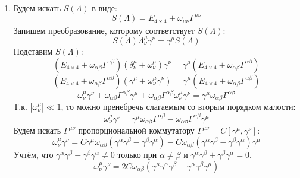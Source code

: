 \documentclass[12pt]{article}
\begin{document}
\begin{enumerate}
    \item Будем искать $S(\Lambda)$ в виде:
    \begin{equation}
        S(\Lambda)=E_{4\times 4}+\omega_{\mu\nu}\Gamma^{\mu\nu}
    \end{equation}
    Запишем преобразование, которому соответствует $S(\Lambda)$:
    \begin{equation}
        S(\Lambda)\Lambda_\nu^\mu\gamma^\nu=\gamma^\mu S(\Lambda)
    \end{equation}
    Подставим $S(\Lambda)$:
    \begin{equation}
        (E_{4\times 4}+\omega_{\alpha\beta}\Gamma^{\alpha\beta})(\delta_\nu^\mu+\omega_\nu^\mu)\gamma^\nu=\gamma^\mu(E_{4\times 4}+\omega_{\alpha\beta}\Gamma^{\alpha\beta})
    \end{equation}
    \begin{equation}
        (E_{4\times 4}+\omega_{\alpha\beta}\Gamma^{\alpha\beta})(\gamma^\mu+\omega_\nu^\mu\gamma^\nu)=\gamma^\mu(E_{4\times 4}+\omega_{\alpha\beta}\Gamma^{\alpha\beta})
    \end{equation}
    \begin{equation}
        \omega_\nu^\mu\gamma^\nu+\omega_{\alpha\beta}\Gamma^{\alpha\beta}\gamma^\mu+\omega_{\alpha\beta}\Gamma^{\alpha\beta}\omega_\nu^\mu\gamma^\nu=\gamma^\mu\omega_{\alpha\beta}\Gamma^{\alpha\beta}
    \end{equation}
    Т.к. $|\omega_\nu^\mu|\ll 1$, то можно пренебречь слагаемым со вторым порядком малости:
    \begin{equation}
        \omega_\nu^\mu\gamma^\nu=\gamma^\mu\omega_{\alpha\beta}\Gamma^{\alpha\beta}-\omega_{\alpha\beta}\Gamma^{\alpha\beta}\gamma^\mu
    \end{equation}
    Будем искать $\Gamma^{\mu\nu}$ пропорциональной коммутатору $\Gamma^{\mu\nu}=C[\gamma^\mu,\gamma^\nu]$:
    \begin{equation}
        \omega_\nu^\mu\gamma^\nu=C\gamma^\mu\omega_{\alpha\beta}(\gamma^\alpha\gamma^\beta-\gamma^\beta\gamma^\alpha)-C\omega_{\alpha\beta}(\gamma^\alpha\gamma^\beta-\gamma^\beta\gamma^\alpha)\gamma^\mu
    \end{equation}
    Учтём, что $\gamma^\alpha\gamma^\beta-\gamma^\beta\gamma^\alpha\neq0$ только при $\alpha\neq\beta$ и $\gamma^\alpha\gamma^\beta+\gamma^\beta\gamma^\alpha=0$.
    \begin{equation}
        \omega_\nu^\mu\gamma^\nu=2C\omega_{\alpha\beta}(\gamma^\mu\gamma^\alpha\gamma^\beta-\gamma^\alpha\gamma^\beta\gamma^\mu)
    \end{equation}

\end{enumerate}
\end{document}
